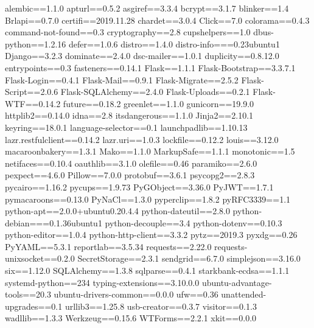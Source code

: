 alembic==1.1.0
apturl==0.5.2
asgiref==3.3.4
bcrypt==3.1.7
blinker==1.4
Brlapi==0.7.0
certifi==2019.11.28
chardet==3.0.4
Click==7.0
colorama==0.4.3
command-not-found==0.3
cryptography==2.8
cupshelpers==1.0
dbus-python==1.2.16
defer==1.0.6
distro==1.4.0
distro-info===0.23ubuntu1
Django==3.2.3
dominate==2.4.0
dsc-mailer==1.0.1
duplicity==0.8.12.0
entrypoints==0.3
fasteners==0.14.1
Flask==1.1.1
Flask-Bootstrap==3.3.7.1
Flask-Login==0.4.1
Flask-Mail==0.9.1
Flask-Migrate==2.5.2
Flask-Script==2.0.6
Flask-SQLAlchemy==2.4.0
Flask-Uploads==0.2.1
Flask-WTF==0.14.2
future==0.18.2
greenlet==1.1.0
gunicorn==19.9.0
httplib2==0.14.0
idna==2.8
itsdangerous==1.1.0
Jinja2==2.10.1
keyring==18.0.1
language-selector==0.1
launchpadlib==1.10.13
lazr.restfulclient==0.14.2
lazr.uri==1.0.3
lockfile==0.12.2
louis==3.12.0
macaroonbakery==1.3.1
Mako==1.1.0
MarkupSafe==1.1.1
monotonic==1.5
netifaces==0.10.4
oauthlib==3.1.0
olefile==0.46
paramiko==2.6.0
pexpect==4.6.0
Pillow==7.0.0
protobuf==3.6.1
psycopg2==2.8.3
pycairo==1.16.2
pycups==1.9.73
PyGObject==3.36.0
PyJWT==1.7.1
pymacaroons==0.13.0
PyNaCl==1.3.0
pyperclip==1.8.2
pyRFC3339==1.1
python-apt==2.0.0+ubuntu0.20.4.4
python-dateutil==2.8.0
python-debian===0.1.36ubuntu1
python-decouple==3.4
python-dotenv==0.10.3
python-editor==1.0.4
python-http-client==3.3.2
pytz==2019.3
pyxdg==0.26
PyYAML==5.3.1
reportlab==3.5.34
requests==2.22.0
requests-unixsocket==0.2.0
SecretStorage==2.3.1
sendgrid==6.7.0
simplejson==3.16.0
six==1.12.0
SQLAlchemy==1.3.8
sqlparse==0.4.1
starkbank-ecdsa==1.1.1
systemd-python==234
typing-extensions==3.10.0.0
ubuntu-advantage-tools==20.3
ubuntu-drivers-common==0.0.0
ufw==0.36
unattended-upgrades==0.1
urllib3==1.25.8
usb-creator==0.3.7
visitor==0.1.3
wadllib==1.3.3
Werkzeug==0.15.6
WTForms==2.2.1
xkit==0.0.0
